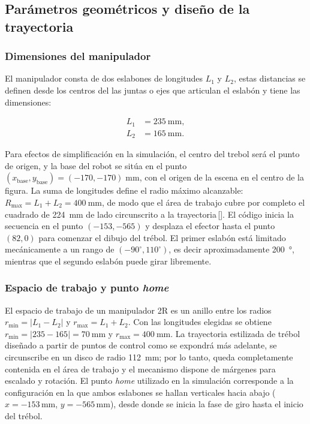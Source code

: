 \documentclass[11pt,a4paper]{article}
\begin{document}
\subsection{Parámetros geométricos y diseño de la trayectoria}

\subsubsection{Dimensiones del manipulador}

El manipulador consta de dos eslabones de longitudes $L_1$ y $L_2$, estas distancias se definen desde los centros del las juntas o ejes que articulan el eslabón y tiene las dimensiones:

\begin{align*}
L_1 &= \SI{235}{\milli\metre},\\
L_2 &= \SI{165}{\milli\metre}.
\end{align*}

Para efectos de simplificación en la simulación, el centro del trebol será el punto de origen, y la base del robot se sitúa en el punto $(x_\text{base},y_\text{base}) = (-170,-170)\;\text{mm}$, con el origen de la escena en el centro de la figura.  La suma de longitudes define el radio máximo alcanzable: $R_\text{max}=L_1+L_2=\SI{400}{\milli\metre}$, de modo que el área de trabajo cubre por completo el cuadrado de \SI{224}{\milli\metre} de lado circunscrito a la trayectoria\,[\!\cite{proyecto}].  El código inicia la secuencia en el punto $(-153,-565)$ y desplaza el efector hasta el punto $(82,0)$ para comenzar el dibujo del trébol.  El primer eslabón está limitado mecánicamente a un rango de $(-90^{\circ},110^{\circ})$, es decir aproximadamente \SI{200}{\degree}, mientras que el segundo eslabón puede girar libremente.

\subsubsection{Espacio de trabajo y punto \textit{home}}

El espacio de trabajo de un manipulador 2R es un anillo entre los radios $r_{\min}=|L_1-L_2|$ y $r_{\max}=L_1+L_2$.  Con las longitudes elegidas se obtiene $r_{\min}=|235-165|=\SI{70}{\milli\metre}$ y $r_{\max}=\SI{400}{\milli\metre}$.  La trayectoria estilizada de trébol diseñado a partir de puntos de control como se expondrá más adelante, se circunscribe en un disco de radio \SI{112}{\milli\metre}; por lo tanto, queda completamente contenida en el área de trabajo y el mecanismo dispone de márgenes para escalado y rotación.  El punto \emph{home} utilizado en la simulación corresponde a la configuración en la que ambos eslabones se hallan verticales hacia abajo ($x=-153\,\text{mm}$, $y=-565\,\text{mm}$), desde donde se inicia la fase de giro hasta el inicio del trébol.
\end{document}
